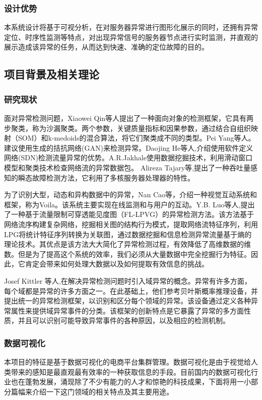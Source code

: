 \subsubsection{设计优势}
本系统设计将基于可视分析，在对服务器异常进行图形化展示的同时，还拥有异常定位、时序性监测等特点，对出现异常信号的服务器节点进行实时监测，并直观的展示造成该异常的任务，从而达到快速、准确的定位故障的目的。
\subsection{项目背景及相关理论}
\subsubsection{研究现状}
{面对异常检测问题}\cite{article2}，Xiaowei Qin等人提出了一种{面向对象的检测框架}\cite{article3}，它具有两步聚类，称为沙漏聚类。两个参数，关键质量指标和因果参数，通过结合自组织映射（SOM）和k-medoids的混合算法，将它们聚类成不同的类型。{Pei Yang等人}\cite{article4}。建议使用生成的拮抗网络(GAN)来检测异常。{Daojing He等人}\cite{article6},介绍使用软件定义网络(SDN)检测流量异常的优势。A.R.Jakhale\cite{article10}使用{数据挖掘}\cite{article7}\cite{article8}\cite{article9}技术，利用滑动窗口模型和聚类技术检查网络流的异常数据包。 {Alireza Tajary}\cite{article11}等,提出了一种吞吐量感知的瞬态故障检测方法，它利用了多核服务器处理器的特性。

为了识别大型，动态和异构数据中的异常\cite{article14}，Nan Cao等，介绍一种视觉互动\cite{article20}\cite{article21}\cite{article22}系统和框架，称为Voila。该系统主要实现在线监测和与用户的互动。{Y.B. Luo等人}\cite{article23},提出了一种基于流量限制可穿透能见度图（FL-LPVG）的异常检测方法。该方法基于网络流序构建复杂网络，挖掘相关图的结构行为模式，提取网络流特征序列，利用LPG将统计特征序列转换为关联图，通过数据挖掘和信息检测异常流量基于熵的理论技术。其优点是该方法大大简化了异常检测过程，有效降低了高维数据的维数。但是为了提高这个系统的效率，我们必须从大量数据中完全挖掘行为特征。因此，它肯定会带来如何处理大数据以及如何提取有效信息的挑战。

{Josef Kittler 等人}\cite{article27},在解决异常检测问题时引入{域异常的概念}\cite{article24}\cite{article25}。异常有许多方面，每个域都是异常的许多方面之一。在此基础上，他们参考贝叶斯概率推理设备，并提出统一的{异常检测框架}\cite{article26}，以识别和区分每个领域的异常。该设备通过定义各种异常属性来提供域异常事件的分类。该框架的创新特点是它暴露了异常的多方面性质，并且可以识别可能导致异常事件的各种原因，以及相应的检测机制。

\subsubsection{数据可视化}
本项目的特征是基于数据可视化的电商平台集群管理。数据可视化是由于视觉给人类带来的感知是最直观最有效率的一种获取信息的手段。目前国内的数据可视化行业也在蓬勃发展，涌现除了不少有能力的人才和惊艳的科技成果，下面将用一小部分篇幅来介绍一下这门领域的相关特点及其主要用途。

